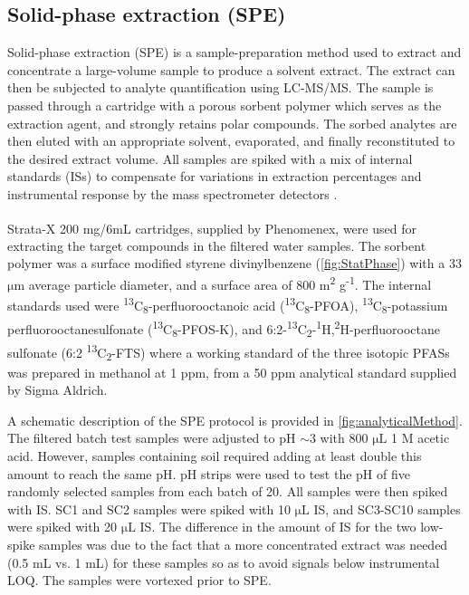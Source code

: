 \subsection{Solid-phase extraction (SPE)}
Solid-phase extraction (\acrshort{SPE}) is a sample-preparation method used to extract and concentrate a large-volume sample to produce a solvent extract. The extract can then be subjected to analyte quantification using LC-MS/MS. The sample is passed through a cartridge with a porous sorbent polymer which serves as the extraction agent, and strongly retains polar compounds. The sorbed analytes are then eluted with an appropriate solvent, evaporated, and finally reconstituted to the desired extract volume. All samples are spiked with a mix of internal standards (\acrshort{IS}s) to compensate for variations in extraction percentages and instrumental response by the mass spectrometer detectors \citep{arvaniti2014}.

Strata-X\textsuperscript{\textregistered} 200 mg/6mL cartridges, supplied by Phenomenex, were used for extracting the target compounds in the filtered water samples. The sorbent polymer was a surface modified styrene divinylbenzene (\cref{fig:StatPhase}) with a 33 $\mathrm{\mu m}$ average particle diameter, and a surface area of 800 m\textsuperscript{2} g\textsuperscript{-1}. The internal standards used were \textsuperscript{13}C\textsubscript{8}-perfluorooctanoic acid (\textsuperscript{13}C\textsubscript{8}-PFOA), \textsuperscript{13}C\textsubscript{8}-potassium perfluorooctanesulfonate (\textsuperscript{13}C\textsubscript{8}-PFOS-K), and 6:2-\textsuperscript{13}C\textsubscript{2}-\textsuperscript{1}H,\textsuperscript{2}H-perfluorooctane sulfonate (6:2 \textsuperscript{13}C\textsubscript{2}-FTS) where a working standard of the three isotopic PFASs was prepared in methanol at 1 ppm, from a 50 ppm analytical standard supplied by Sigma Aldrich.

A schematic description of the SPE protocol is provided in \cref{fig:analyticalMethod}. The filtered batch test samples were adjusted to pH $\sim$3 with 800 $\mathrm{\mu L}$ 1 M acetic acid. However, samples containing soil required adding at least double this amount to reach the same pH. pH strips were used to test the pH of five randomly selected samples from each batch of 20. All samples were then spiked with IS. SC1 and SC2 samples were spiked with 10 $\mathrm{\mu L}$ IS, and SC3-SC10 samples were spiked with 20 $\mathrm{\mu L}$ IS. The difference in the amount of IS for the two low-spike samples was due to the fact that a more concentrated extract was needed (0.5 mL vs. 1 mL) for these samples so as to avoid signals below instrumental \acrshort{LOQ}. The samples were vortexed prior to SPE.

